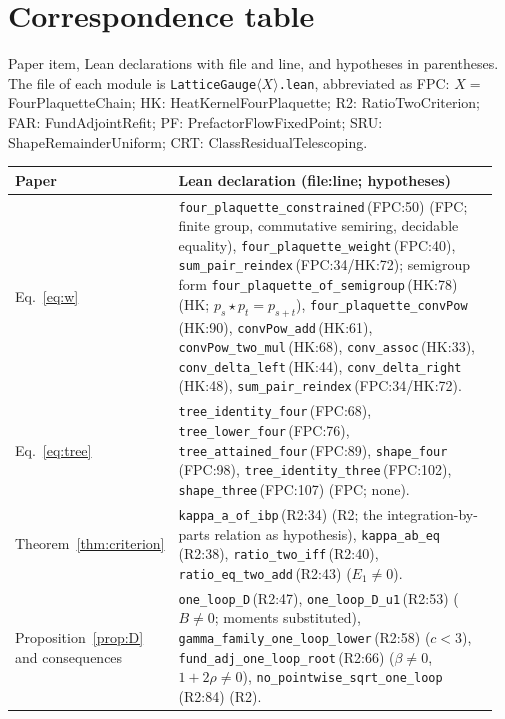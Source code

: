 \documentclass[11pt,a4paper]{article}
\theoremstyle{definition}
\theoremstyle{remark}
\newcommand{\code}[1]{\texttt{#1}}
\begin{document}
\fussy
\section{Correspondence table}\label{sec:corr}

Paper item, Lean declarations with file and line, and hypotheses in parentheses. The file of each module is \code{LatticeGauge}$\langle X\rangle$\code{.lean}, abbreviated as FPC: $X=$ FourPlaquetteChain; HK: HeatKernelFourPlaquette; R2: RatioTwoCriterion; FAR: FundAdjointRefit; PF: PrefactorFlowFixedPoint; SRU: ShapeRemainderUniform; CRT: ClassResidualTelescoping.

{\small\sloppy
\begin{longtable}{@{}p{0.2\linewidth}p{0.76\linewidth}@{}}
\toprule
Paper & Lean declaration (file:line; hypotheses)\\ \midrule
\endhead
Eq.~\eqref{eq:w} & \code{four\_plaquette\_constrained}\,{\scriptsize(FPC:50)} (FPC; finite group, commutative semiring, decidable equality), \code{four\_plaquette\_weight}\,{\scriptsize(FPC:40)}, \code{sum\_pair\_reindex}\,{\scriptsize(FPC:34/HK:72)}; semigroup form \code{four\_plaquette\_of\_semigroup}\,{\scriptsize(HK:78)} (HK; $p_s\star p_t=p_{s+t}$), \code{four\_plaquette\_convPow}\,{\scriptsize(HK:90)}, \code{convPow\_add}\,{\scriptsize(HK:61)}, \code{convPow\_two\_mul}\,{\scriptsize(HK:68)}, \code{conv\_assoc}\,{\scriptsize(HK:33)}, \code{conv\_delta\_left}\,{\scriptsize(HK:44)}, \code{conv\_delta\_right}\,{\scriptsize(HK:48)}, \code{sum\_pair\_reindex}\,{\scriptsize(FPC:34/HK:72)}. \\
\midrule
Eq.~\eqref{eq:tree} & \code{tree\_identity\_four}\,{\scriptsize(FPC:68)}, \code{tree\_lower\_four}\,{\scriptsize(FPC:76)}, \code{tree\_attained\_four}\,{\scriptsize(FPC:89)}, \code{shape\_four}\,{\scriptsize(FPC:98)}, \code{tree\_identity\_three}\,{\scriptsize(FPC:102)}, \code{shape\_three}\,{\scriptsize(FPC:107)} (FPC; none). \\
\midrule
Theorem~\ref{thm:criterion} & \code{kappa\_a\_of\_ibp}\,{\scriptsize(R2:34)} (R2; the integration-by-parts relation as hypothesis), \code{kappa\_ab\_eq}\,{\scriptsize(R2:38)}, \code{ratio\_two\_iff}\,{\scriptsize(R2:40)}, \code{ratio\_eq\_two\_add}\,{\scriptsize(R2:43)} ($E_1\ne0$). \\
\midrule
Proposition~\ref{prop:D} and consequences & \code{one\_loop\_D}\,{\scriptsize(R2:47)}, \code{one\_loop\_D\_u1}\,{\scriptsize(R2:53)} ($B\ne0$; moments substituted), \code{gamma\_family\_one\_loop\_lower}\,{\scriptsize(R2:58)} ($c<3$), \code{fund\_adj\_one\_loop\_root}\,{\scriptsize(R2:66)} ($\beta\ne0$, $1+2\rho\ne0$), \code{no\_pointwise\_sqrt\_one\_loop}\,{\scriptsize(R2:84)} (R2). \\

\end{longtable}}
\end{document}
